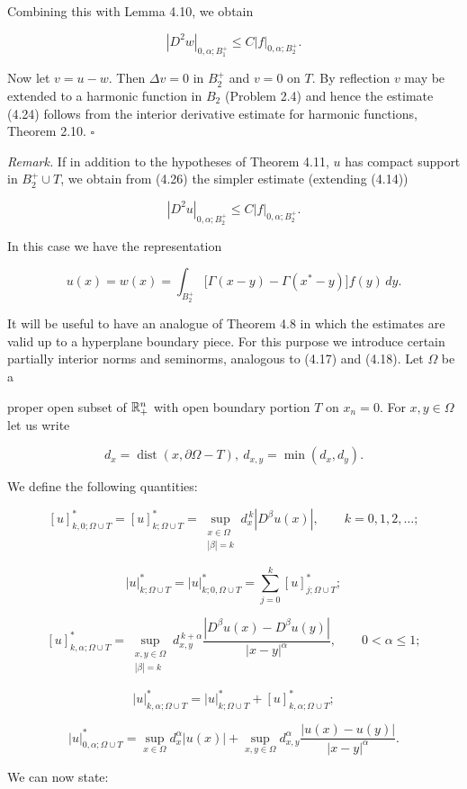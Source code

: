 \begin{theorem}
Combining this with Lemma 4.10, we obtain

\begin{equation}
\tag{4.26}
|D^2w|_{0,\alpha;B_1^+}\le C|f|_{0,\alpha;B_2^+}.
\end{equation}

Now let $v=u-w$. Then $\Delta v=0$ in $B_2^+$ and $v=0$ on $T$. By reflection $v$ may be extended to a harmonic function in $B_2$ (Problem 2.4) and hence the estimate (4.24) follows from the interior derivative estimate for harmonic functions, Theorem 2.10. $\square$

\textit{Remark.} If in addition to the hypotheses of Theorem 4.11, $u$ has compact support in $B_2^+\cup T$, we obtain from (4.26) the simpler estimate (extending (4.14))

\begin{equation}
\tag{4.27}
|D^2u|_{0,\alpha;B_2^+}\le C|f|_{0,\alpha;B_2^+}.
\end{equation}

In this case we have the representation

\begin{equation}
\tag{4.28}
u(x)=w(x)=\int_{B_2^+}\bigl[\Gamma(x-y)-\Gamma(x^*-y)\bigr]f(y)\,dy.
\end{equation}

It will be useful to have an analogue of Theorem 4.8 in which the estimates are valid up to a hyperplane boundary piece. For this purpose we introduce certain partially interior norms and seminorms, analogous to (4.17) and (4.18). Let $\Omega$ be a


proper open subset of $\mathbb{R}^{n}_{+}$ with open boundary portion $T$ on $x_n=0$. For $x,y\in \Omega$
let us write

\[
 d_x=\operatorname{dist}(x,\partial\Omega-T),\ d_{x,y}=\min(d_x,d_y).
\]

We define the following quantities:

\[
[u]^*_{k,0;\Omega\cup T}=[u]^*_{k;\Omega\cup T}=\sup_{\substack{x\in\Omega\\ |\beta|=k}} d_x^{\,k}|D^{\beta}u(x)|,\qquad k=0,1,2,\dots;
\]

\begin{equation}
\tag{4.29}
|u|^*_{k;\Omega\cup T}=|u|^*_{k;0,\Omega\cup T}=\sum_{j=0}^{k}[u]^*_{j;\Omega\cup T};
\end{equation}

\[
[u]^*_{k,\alpha;\Omega\cup T}=\sup_{\substack{x,y\in\Omega\\ |\beta|=k}} d_{x,y}^{\,k+\alpha}\frac{|D^{\beta}u(x)-D^{\beta}u(y)|}{|x-y|^{\alpha}},\qquad 0<\alpha\leq 1;
\]

\[
|u|^*_{k,\alpha;\Omega\cup T}=|u|^*_{k;\Omega\cup T}+[u]^*_{k,\alpha;\Omega\cup T};
\]

\[
|u|^*_{0,\alpha;\Omega\cup T}=\sup_{x\in\Omega} d_x^{\alpha}|u(x)|+\sup_{x,y\in\Omega} d_{x,y}^{\alpha}\frac{|u(x)-u(y)|}{|x-y|^{\alpha}}.
\]

We can now state:

\end{theorem}

